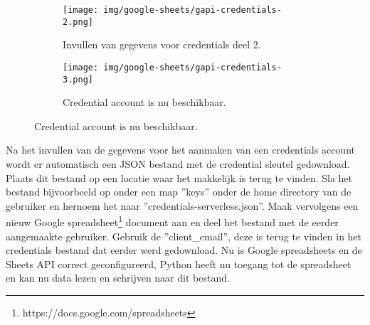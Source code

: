 \begin{figure}[h]\ContinuedFloat
    \begin{subfigure}{0.5\textwidth}
        \captionsetup{width=0.8\linewidth}
        \texttt{[image: img/google-sheets/gapi-credentials-2.png]}
        \centering
        \caption{Invullen van gegevens voor credentials deel 2.}
    \end{subfigure}
    \begin{subfigure}{0.5\textwidth}
        \captionsetup{width=0.8\linewidth}
        \texttt{[image: img/google-sheets/gapi-credentials-3.png]}
        \centering
        \caption{Credential account is nu beschikbaar.}
    \end{subfigure}
\end{figure}

Na het invullen van de gegevens voor het aanmaken van een credentials account wordt er automatisch een JSON bestand met de credential sleutel gedownload. Plaats dit bestand op een locatie waar het makkelijk is terug te vinden. Sla het bestand bijvoorbeeld op onder een map ''keys'' onder de home directory van de gebruiker en hernoem het naar ''credentials-serverless.json''. Maak vervolgens een nieuw Google spreadsheet\footnote{https://docs.google.com/spreadsheets} document aan en deel het bestand met de eerder aangemaakte gebruiker. Gebruik de ''client\_email'', deze is terug te vinden in het credentials bestand dat eerder werd gedownload. Nu is Google spreadsheets en de Sheets API correct geconfigureerd, Python heeft nu toegang tot de spreadsheet en kan nu data lezen en schrijven naar dit bestand.